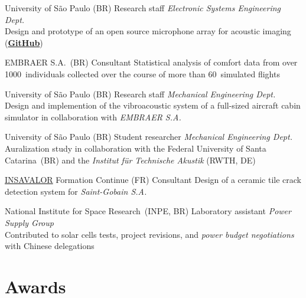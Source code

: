 \documentclass{cvlfoc}
\begin{document}
\begin{entrydate}
		{University of S\~{a}o Paulo (BR)}
		{Research staff}
		{\textit{Electronic Systems Engineering Dept.}
		\\
		Design and prototype of an open source microphone array for acoustic
		imaging\\(\href{https://github.com/lfochamon/memsarray}{\textbf{GitHub}})}

		{EMBRAER S.A.\ (BR)}
		{Consultant}
		{Statistical analysis of comfort data from over 1000~individuals
		collected over the course of more than 60~simulated flights}

		{University of S\~{a}o Paulo (BR)}
		{Research staff}
		{\textit{Mechanical Engineering Dept.}
		\\
		Design and implemention of the vibroacoustic system of
		a full-sized aircraft cabin simulator in collaboration with \emph{EMBRAER S.A.}}

		{University of S\~{a}o Paulo (BR)}
		{Student researcher}
		{\textit{Mechanical Engineering Dept.}
		\\
		Auralization study in collaboration with the Federal University of Santa Catarina~(BR) and the \textit{Institut für Technische Akustik}
		(RWTH, DE)}

		{\href{https://www.insavalor.fr}{INSAVALOR} Formation Continue (FR)}
		{Consultant}
		{Design of a ceramic tile crack detection system for \emph{Saint-Gobain S.A.}}

		{National Institute for Space Research~(INPE, BR)}
		{Laboratory assistant}
		{\textit{Power Supply Group}
		\\
		Contributed to solar cells tests, project revisions, and
		\emph{power budget negotiations} with Chinese delegations}
\end{entrydate}



\section*{Awards}
\end{document}
